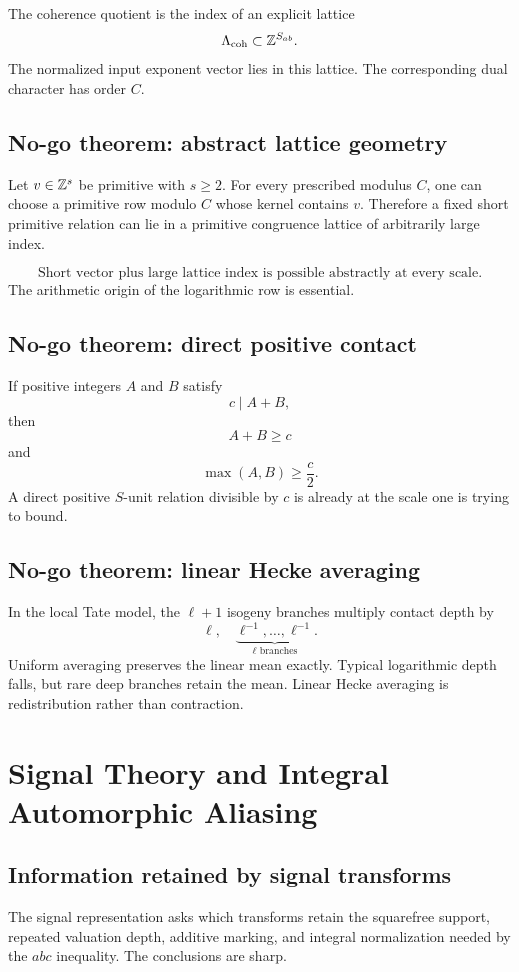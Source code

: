 The coherence quotient is the index of an explicit lattice
\[
\Lambda_{\mathrm{coh}}
\subset
\mathbb Z^{S_{ab}}.
\]
The normalized input exponent vector lies in this lattice. The corresponding dual character has order $C$.

\section{No-go theorem: abstract lattice geometry}
Let $v\in\mathbb Z^s$ be primitive with $s\ge2$. For every prescribed modulus $C$, one can choose a primitive row modulo $C$ whose kernel contains $v$. Therefore a fixed short primitive relation can lie in a primitive congruence lattice of arbitrarily large index.

\[
\boxed{
\text{Short vector plus large lattice index is possible abstractly at every scale.}
}
\]
The arithmetic origin of the logarithmic row is essential.

\section{No-go theorem: direct positive contact}
If positive integers $A$ and $B$ satisfy
\[
c\mid A+B,
\]
then
\[
A+B\ge c
\]
and
\[
\boxed{
\max(A,B)\ge\frac c2.
}
\]
A direct positive $S$-unit relation divisible by $c$ is already at the scale one is trying to bound.

\section{No-go theorem: linear Hecke averaging}
In the local Tate model, the $\ell+1$ isogeny branches multiply contact depth by
\[
\ell,
\quad
\underbrace{\ell^{-1},\ldots,\ell^{-1}}_{\ell\text{ branches}}.
\]
Uniform averaging preserves the linear mean exactly. Typical logarithmic depth falls, but rare deep branches retain the mean. Linear Hecke averaging is redistribution rather than contraction.

\chapter{Signal Theory and Integral Automorphic Aliasing}

\section{Information retained by signal transforms}
The signal representation asks which transforms retain the squarefree support, repeated valuation depth, additive marking, and integral normalization needed by the $abc$ inequality. The conclusions are sharp.


